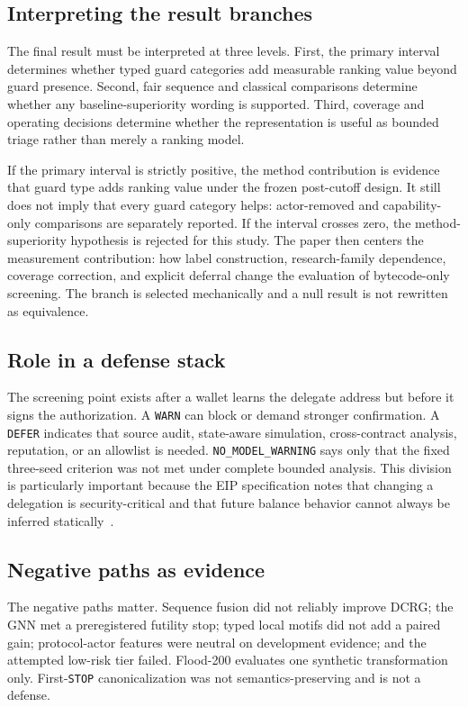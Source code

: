 \documentclass[conference]{IEEEtran}
\newcommand{\code}[1]{\texttt{#1}}
\begin{document}
\subsection{Interpreting the result branches}

The final result must be interpreted at three levels. First, the primary interval determines whether
typed guard categories add measurable ranking value beyond guard presence. Second, fair sequence and
classical comparisons determine whether any baseline-superiority wording is supported. Third,
coverage and operating decisions determine whether the representation is useful as bounded triage
rather than merely a ranking model.

If the primary interval is strictly positive, the method contribution is evidence that guard type
adds ranking value under the frozen post-cutoff design. It still does not imply that every guard
category helps: actor-removed and capability-only comparisons are separately reported. If the
interval crosses zero, the method-superiority hypothesis is rejected for this study. The paper then
centers the measurement contribution: how label construction, research-family dependence, coverage
correction, and explicit deferral change the evaluation of bytecode-only screening. The branch is
selected mechanically and a null result is not rewritten as equivalence.

\subsection{Role in a defense stack}

The screening point exists after a wallet learns the delegate address but before it signs the
authorization. A \code{WARN} can block or demand stronger confirmation. A \code{DEFER} indicates
that source audit, state-aware simulation, cross-contract analysis, reputation, or an allowlist is
needed. \code{NO\_MODEL\_WARNING} says only that the fixed three-seed criterion was not met under
complete bounded analysis. This division is particularly important because the EIP specification
notes that changing a delegation is security-critical and that future balance behavior cannot
always be inferred statically~\cite{eip7702}.

\subsection{Negative paths as evidence}

The negative paths matter. Sequence fusion did not reliably improve DCRG; the GNN met a preregistered
futility stop; typed local motifs did not add a paired gain; protocol-actor features were neutral on
development evidence; and the attempted low-risk tier failed. Flood-200 evaluates one synthetic
transformation only. First-\code{STOP} canonicalization was not semantics-preserving and is not a
defense.
\end{document}
